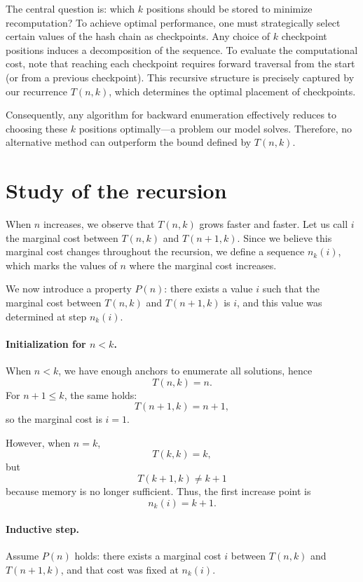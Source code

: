 \documentclass[a4paper,10pt]{article}
\begin{document}
The central question is: which $k$ positions should be stored to minimize recomputation?  
To achieve optimal performance, one must strategically select certain values of the hash chain as checkpoints.  
Any choice of $k$ checkpoint positions induces a decomposition of the sequence.  
To evaluate the computational cost, note that reaching each checkpoint requires forward traversal from the start (or from a previous checkpoint).  
This recursive structure is precisely captured by our recurrence $T(n, k)$, which determines the optimal placement of checkpoints.  

Consequently, any algorithm for backward enumeration effectively reduces to choosing these $k$ positions optimally—a problem our model solves.  
Therefore, no alternative method can outperform the bound defined by $T(n, k)$.



\section{Study of the recursion}

When \(n\) increases, we observe that \(T(n,k)\) grows faster and faster.  
Let us call \(i\) the marginal cost between \(T(n,k)\) and \(T(n+1,k)\).  
Since we believe this marginal cost changes throughout the recursion, we define a sequence \(n_k(i)\), which marks the values of \(n\) where the marginal cost increases.

We now introduce a property \(P(n)\): there exists a value \(i\) such that the marginal cost between \(T(n,k)\) and \(T(n+1,k)\) is \(i\), and this value was determined at step \(n_k(i)\).

\paragraph*{Initialization for \(n < k\).}
When \(n < k\), we have enough anchors to enumerate all solutions, hence
\[
T(n,k) = n .
\]
For \(n+1 \le k\), the same holds:
\[
T(n+1,k) = n+1,
\]
so the marginal cost is \(i = 1\).

However, when \(n = k\),
\[
T(k,k) = k,
\]
but
\[
T(k+1,k) \neq k+1
\]
because memory is no longer sufficient.  
Thus, the first increase point is
\[
n_k(i) = k+1.
\]

\paragraph*{Inductive step.}
Assume \(P(n)\) holds: there exists a marginal cost \(i\) between \(T(n,k)\) and \(T(n+1,k)\), and that cost was fixed at \(n_k(i)\).
\end{document}
